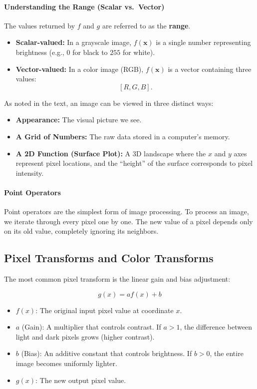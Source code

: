 \documentclass[12pt]{article}
\begin{document}
\paragraph{Understanding the Range (Scalar vs.\ Vector)}

The values returned by $f$ and $g$ are referred to as the \textbf{range}.

\begin{itemize}
    \item \textbf{Scalar-valued:} In a grayscale image, $f(\mathbf{x})$ is a single number representing brightness (e.g., $0$ for black to $255$ for white).
    \item \textbf{Vector-valued:} In a color image (RGB), $f(\mathbf{x})$ is a vector containing three values:
          \[
              [R, G, B].
          \]
\end{itemize}

As noted in the text, an image can be viewed in three distinct ways:

\begin{itemize}
    \item \textbf{Appearance:} The visual picture we see.
    \item \textbf{A Grid of Numbers:} The raw data stored in a computer's memory.
    \item \textbf{A 2D Function (Surface Plot):} A 3D landscape where the $x$ and $y$ axes represent pixel locations, and the ``height'' of the surface corresponds to pixel intensity.
\end{itemize}


\paragraph{Point Operators}
Point operators are the simplest form of image processing. To process an image, we iterate through every pixel one by one. The new value of a pixel depends only on its old value, completely ignoring its neighbors.

\subsection{Pixel Transforms and Color Transforms}

The most common pixel transform is the linear gain and bias adjustment:

\[
    g(x) = a f(x) + b
\]

\begin{itemize}
    \item $f(x)$: The original input pixel value at coordinate $x$.
    \item $a$ (Gain): A multiplier that controls contrast. If $a > 1$, the difference between light and dark pixels grows (higher contrast).
    \item $b$ (Bias): An additive constant that controls brightness. If $b > 0$, the entire image becomes uniformly lighter.
    \item $g(x)$: The new output pixel value.
\end{itemize}
\end{document}
